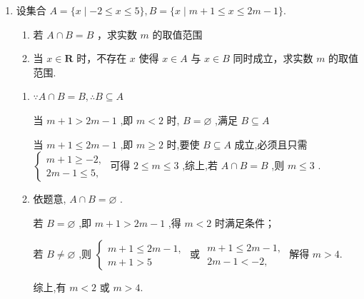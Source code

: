 \begin{enumerate}
\begin{enumerate}
        \item 设集合 $A = \{ x \mid   - 2 \leq  x \leq  5\} ,B = \{ x \mid  m + 1 \leq  x \leq  {2m} - 1\}$.
        \begin{enumerate}
            \item 若 $A \cap  B = B$ ，求实数 $m$ 的取值范围
            \item 当 $x \in  \mathbf{R}$ 时，不存在 $x$ 使得 $x \in  A$ 与 $x \in  B$ 同时成立，求实数 $m$ 的取值范围.
        \end{enumerate}
        \begin{jieda}
            \begin{enumerate}
                \item $\because A \cap  B = B,\therefore B \subseteq  A$
                
                当 $m + 1 > {2m} - 1$ ,即 $m < 2$ 时, $B = \varnothing$ ,满足 $B \subseteq  A$
                
                当 $m + 1 \leq  {2m} - 1$ ,即 $m \geq  2$ 时,要使 $B \subseteq  A$ 成立,必须且只需 $\left\{  \begin{array}{l} m + 1 \geq   - 2, \\  {2m} - 1 \leq  5, \end{array}\right.$ 可得 $2 \leq  m \leq  3$ ,综上,若 $A \cap  B = B$ ,则 $m \leq  3$ .
                \item 依题意, $A \cap  B = \varnothing$ . 
                
                若 $B = \varnothing$ ,即 $m + 1 > {2m} - 1$ ,得 $m < 2$ 时满足条件；
                
                若 $B \neq  \varnothing$ ,则 $\left\{  \begin{array}{l} m + 1 \leq  {2m} - 1, \\  m + 1 > 5 \end{array}\right.$ 或 $\begin{array}{l} m + 1 \leq  {2m} - 1, \\  {2m} - 1 <  - 2, \end{array}$ 解得 $m > 4$. 
                
                综上,有 $m < 2$ 或 $m > 4$.
            \end{enumerate}
        \end{jieda}
        

\end{enumerate}
\end{enumerate}
